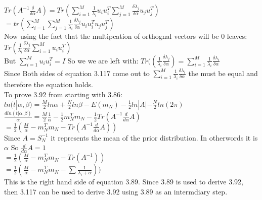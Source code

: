 \documentclass[11pt,leqno,fleqn]{article}
\begin{document}
$Tr(A^{-1}\frac{\delta}{\delta \alpha}A ) = Tr(  \sum_{i = 1}^M \frac{1}{\lambda_i} u_i u_i^T \sum_{j=1}^M \frac{\delta \lambda_j}{\delta \alpha} u_j u_j^T) $\\
$= tr( \sum_{i = 1}^M  \sum_{j=1}^M \frac{1}{\lambda_i} \frac{\delta \lambda_j}{\delta \alpha} u_i u_i^T   u_j u_j^T) $\\
Now using the fact that the multipcation of orthognal vectors will be 0 leaves:
$Tr(\frac{1}{\lambda_i} \frac{\delta \lambda_j}{\delta \alpha} \sum_{i = 1}^M u_i u_i^T)$\\
But $\sum_{i = 1}^M u_i u_i^T = I$ So we we are left with: $Tr((\frac{1}{\lambda_i} \frac{\delta \lambda_j}{\delta \alpha}) = \sum_{i = 1}^M \frac{1}{\lambda_i} \frac{\delta \lambda_i}{\delta \alpha}$\\
Since Both sides of equation 3.117 come out to $\sum_{i = 1}^M \frac{1}{\lambda_i} \frac{\delta \lambda_i}{\delta \alpha}$ the must be equal and therefore the equation holds.\\
To prove 3.92 from starting with 3.86:\\
$ln(t|\alpha, \beta) = \frac{M}{2} ln \alpha + \frac{N}{2} ln \beta - E(m_N) - \frac{1}{2} ln|A| - \frac{N}{2} ln(2 \pi)$\\
$\frac{dln(t|\alpha, \beta)}{\alpha} = \frac{M}{2} \frac{1}{\alpha}  - \frac{1}{2}m_N^T m_N  - \frac{1}{2} Tr(A^{-1} \frac{d}{d \alpha}A)$\\
$= \frac{1}{2}(\frac{M}{\alpha} - m_N^T m_N  -  Tr(A^{-1} \frac{d}{d \alpha}A))$\\
Since $A = S_N^{-1}$ it represents the mean of the prior distribution. In otherwords it is $\alpha$ So $\frac{d}{d \alpha}A = 1$\\
$= \frac{1}{2}(\frac{M}{\alpha} - m_N^T m_N  -  Tr(A^{-1} ))$\\
$= \frac{1}{2}(\frac{M}{\alpha} - m_N^T m_N  -  \sum \frac{1}{\lambda_i + \alpha} ))$\\
This is the right hand side of equation 3.89. Since 3.89 is used to derive 3.92, then 3.117 can be used to derive 3.92 using 3.89 as an intermdiary step.\\ 
\end{document}
